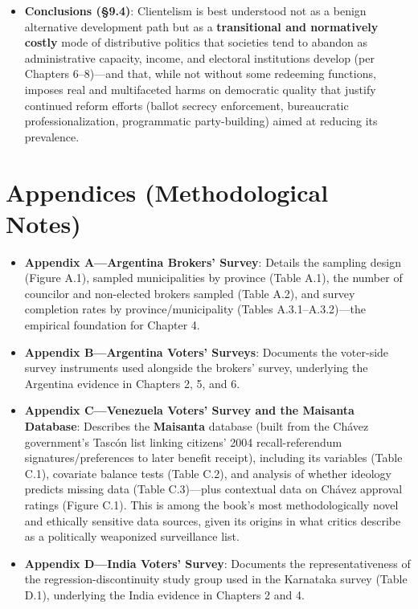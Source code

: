 \documentclass[12pt]{article}
\begin{document}
\begin{itemize}[leftmargin=*, itemsep=4pt]
    \item \textbf{Conclusions (\S9.4)}: Clientelism is best understood not as a benign alternative development path but as a \textbf{transitional and normatively costly} mode of distributive politics that societies tend to abandon as administrative capacity, income, and electoral institutions develop (per Chapters 6--8)---and that, while not without some redeeming functions, imposes real and multifaceted harms on democratic quality that justify continued reform efforts (ballot secrecy enforcement, bureaucratic professionalization, programmatic party-building) aimed at reducing its prevalence.
\end{itemize}

\section{Appendices (Methodological Notes)}

\begin{itemize}[leftmargin=*, itemsep=4pt]
    \item \textbf{Appendix A---Argentina Brokers' Survey}: Details the sampling design (Figure A.1), sampled municipalities by province (Table A.1), the number of councilor and non-elected brokers sampled (Table A.2), and survey completion rates by province/municipality (Tables A.3.1--A.3.2)---the empirical foundation for Chapter 4.
    \item \textbf{Appendix B---Argentina Voters' Surveys}: Documents the voter-side survey instruments used alongside the brokers' survey, underlying the Argentina evidence in Chapters 2, 5, and 6.
    \item \textbf{Appendix C---Venezuela Voters' Survey and the Maisanta Database}: Describes the \textbf{Maisanta} database (built from the Ch\'avez government's Tasc\'on list linking citizens' 2004 recall-referendum signatures/preferences to later benefit receipt), including its variables (Table C.1), covariate balance tests (Table C.2), and analysis of whether ideology predicts missing data (Table C.3)---plus contextual data on Ch\'avez approval ratings (Figure C.1). This is among the book's most methodologically novel and ethically sensitive data sources, given its origins in what critics describe as a politically weaponized surveillance list.
    \item \textbf{Appendix D---India Voters' Survey}: Documents the representativeness of the regression-discontinuity study group used in the Karnataka survey (Table D.1), underlying the India evidence in Chapters 2 and 4.
\end{itemize}
\end{document}
